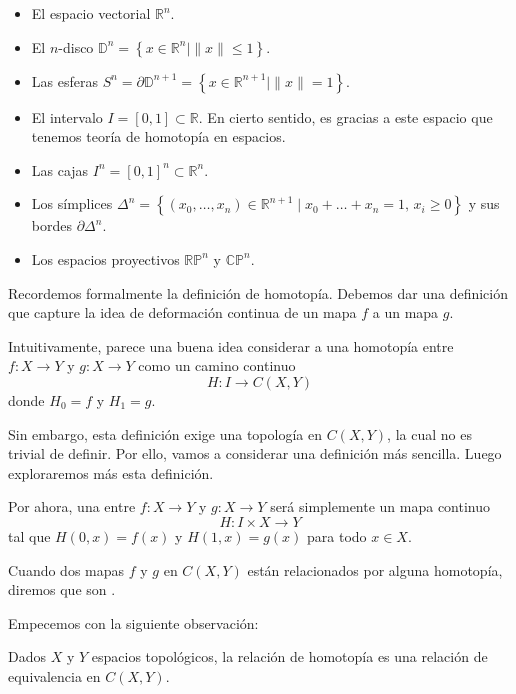 \begin{itemize}
    \item El espacio vectorial $\mathbb{R}^n$.
    \item El $n$-disco $\mathbb{D}^n = \left\{ x \in \mathbb{R}^{n} \mid \|x\| \leq 1 \right\}$.
    \item Las esferas $S^n = \partial \mathbb{D}^{n+1} = \left\{ x \in \mathbb{R}^{n+1} \mid \|x\| = 1 \right\}$.
    \item El intervalo $I = [0, 1] \subset \mathbb{R}$. En cierto sentido, es gracias a este espacio que tenemos teoría de homotopía en espacios.
    \item Las cajas $I^n=[0, 1]^n \subset \mathbb{R}^n$.
    \item Los símplices $\Delta^n = \left\{ (x_0, \ldots, x_n) \in \mathbb{R}^{n+1} \mid x_0 + \ldots + x_n = 1,\, x_i \geq 0 \right\}$ y sus bordes $\partial \Delta^n$.
    \item Los espacios proyectivos $\mathbb{R}\mathbb{P}^n$ y $\mathbb{C}\mathbb{P}^n$.
\end{itemize}

Recordemos formalmente la definición de homotopía. Debemos dar una definición que capture la idea de deformación continua de un mapa $f$ a un mapa $g$.

Intuitivamente, parece una buena idea considerar a una homotopía entre $f\colon X \to Y$ y $g\colon X \to Y$ como un camino continuo 
\[
    H : I \to C(X, Y)
\]
donde $H_0=f$ y $H_1=g$. 

Sin embargo, esta definición exige una topología en $C(X,Y)$, la cual no es trivial de definir. Por ello, vamos a considerar una definición más sencilla. Luego exploraremos más esta definición.

Por ahora, una  entre $f\colon X \to Y$ y $g\colon X \to Y$ será simplemente un mapa continuo 
\[
    H: I \times X \to Y
\]
tal que $H(0,x) = f(x)$ y $H(1,x) = g(x)$ para todo $x \in X$. 

Cuando dos mapas $f$ y $g$ en $C(X,Y)$ están relacionados por alguna homotopía, diremos que son . 

Empecemos con la siguiente observación:  

\begin{proposicion}
    Dados $X$ y $Y$ espacios topológicos, la relación de homotopía es una relación de equivalencia en $C(X,Y)$. 
\end{proposicion}

